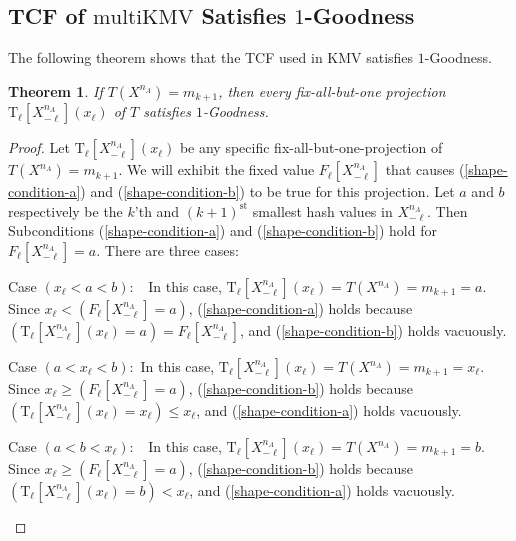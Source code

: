 \documentclass{article}
\newcommand{\xnml}{X^{n_A}_{-\ell}}
\newcommand{\txn}{\mathrm{T_\ell}[X^{n_A}_{-\ell}](x_\ell)}
\newcommand{\xhatfull}{F_\ell[X^{n_A}_{-\ell}]}
\newenvironment{tighterdescription}{\begin{description}\setlength{\itemsep}{1pt}\setlength{\parskip}{1pt}}{\end{description}}
\newtheorem{theorem}{Theorem}[section]
\newcommand{\romIKMV}{\mathrm{multiKMV}}
\begin{document}
\subsection{TCF of $\romIKMV$ Satisfies $1$-Goodness}\label{sec:kmv-sat}
The following theorem shows that the TCF used in KMV satisfies $1$-Goodness. \begin{theorem}\label{thm:kmv-sat}
If $T(X^{n_A}) = m_{k+1}$, then every fix-all-but-one projection $\txn$ of $T$ satisfies $1$-Goodness.
\end{theorem}
\begin{proof}
Let $\txn$ be any specific fix-all-but-one-projection of $T(X^{n_A}) = m_{k+1}$.
We will exhibit the fixed value $\xhatfull$ that causes (\ref{shape-condition-a}) and (\ref{shape-condition-b})
to be true for this projection.
Let $a$ and $b$ respectively be the $k$'th and $(k\!+\!1)^{\text{st}}$
smallest hash values in $\xnml$. 
Then Subconditions (\ref{shape-condition-a}) and (\ref{shape-condition-b}) hold for
$\xhatfull = a$. There are three cases:
\begin{tighterdescription}
\item[Case $(x_\ell < a < b):\;\;$] 
In this case, 
$\txn = T(X^{n_A}) = m_{k+1} = a$. 
Since $x_\ell < (\xhatfull = a)$, 
(\ref{shape-condition-a}) holds because $(\txn = a) = \xhatfull$, and (\ref{shape-condition-b}) holds vacuously.
\item[Case $(a < x_\ell < b):$] 
In this case, 
$\txn = T(X^{n_A}) = m_{k+1} = x_\ell$. 
Since $ x_\ell \ge (\xhatfull = a)$, 
(\ref{shape-condition-b}) holds because  $(\txn = x_\ell) \le x_\ell$, and (\ref{shape-condition-a}) holds vacuously.
\item[Case $(a < b < x_\ell):\;\;$] 
In this case, 
$\txn = T(X^{n_A}) = m_{k+1} = b$. 
Since $ x_\ell \ge (\xhatfull = a)$, 
(\ref{shape-condition-b}) holds because  $(\txn = b) < x_\ell$, and (\ref{shape-condition-a}) holds vacuously.
\end{tighterdescription}
\end{proof}
\end{document}

